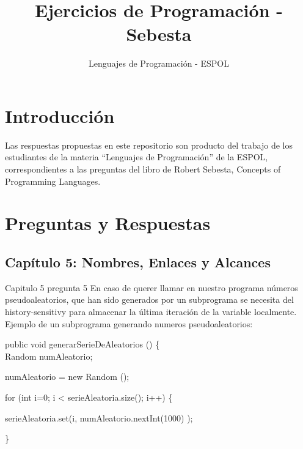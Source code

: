 \documentclass[12pt,oneside]{article}
\title{Ejercicios de Programación - Sebesta}
\author{Lenguajes de Programación - ESPOL}
\begin{document}
\maketitle

\section{Introducción}
Las respuestas propuestas en este repositorio son producto del trabajo de los estudiantes de la materia ``Lenguajes de Programación'' de la ESPOL, correspondientes a las preguntas del libro de Robert Sebesta, Concepts of Programming Languages.

\section{Preguntas y Respuestas}

\subsection{Capítulo 5: Nombres, Enlaces y Alcances}

%
Capitulo 5 pregunta 5
En caso de querer llamar en nuestro programa números pseudoaleatorios, que han sido generados por un subprograma se necesita del history-sensitivy para almacenar la última iteración de la variable localmente. 
Ejemplo de un subprograma generando numeros pseudoaleatorios:

 public void generarSerieDeAleatorios () \{  \\

        Random numAleatorio;

        numAleatorio = new Random ();

        for (int i=0; i < serieAleatoria.size(); i++)  \{

        serieAleatoria.set(i, numAleatorio.nextInt(1000) );

         \}

%

\end{document}
